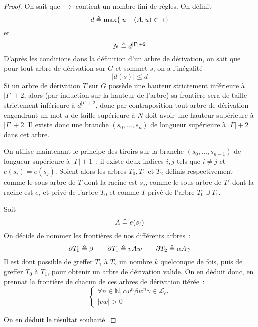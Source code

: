 \begin{proof}
  On sait que $\to$ contient un nombre fini de règles. On définit
  \[d \triangleq \max \{|u| \mid (A,u) \in \to\}\]
  et
  \[N \triangleq d^{|\Gamma|+2}\]
  D'après les conditions dans la définition d'un arbre de dérivation, on sait
  que pour tout arbre de dérivation sur $G$ et sommet $s$, on a l'inégalité
  \[|d(s)| \leq d\]
  Si un arbre de dérivation $T$ sur $G$ possède une hauteur strictement
  inférieure à $|\Gamma| + 2$, alors (par induction sur la hauteur de l'arbre)
  sa frontière sera de taille strictement inférieure à $d^{|\Gamma| + 2}$, donc
  par contraposition tout arbre de dérivation engendrant un mot $u$ de taille
  supérieure à $N$ doit avoir une hauteur supérieure à $|\Gamma| + 2$. Il existe
  donc une branche $(s_0,\ldots,s_n)$ de longueur supérieure à $|\Gamma| + 2$
  dans cet arbre.

  On utilise maintenant le principe des tiroirs sur la branche
  $(s_0,\ldots,s_{n-1})$ de longueur supérieure à $|\Gamma| + 1$~: il existe
  deux indices $i,j$ tels que $i\neq j$ et $e(s_i) = e(s_j)$. Soient alors les
  arbres $T_0,T_1$ et $T_2$ définis respectivement comme le sous-arbre de $T$
  dont la racine est $s_j$, comme le sous-arbre de $T'$ dont la racine est $e_i$
  et privé de l'arbre $T_0$ et comme $T$ privé de l'arbre $T_0\cup T_1$.

  Soit
  \[A \triangleq e(s_i)\]
  On décide de nommer les frontières de nos différents arbres~:
  \[\partial T_0 \triangleq \beta \qquad \partial T_1 \triangleq vAw \qquad
  \partial T_2 \triangleq \alpha A \gamma\]
  Il est dont possible de greffer $T_1$ à $T_2$ un nombre $k$ quelconque de
  fois, puis de greffer $T_0$ à $T_1$, pour obtenir un arbre de dérivation
  valide. On en déduit donc, en prennat la frontière de chacun de ces arbres de
  dérivation itérée~:
  \[\begin{cases}
  \forall n \in \mathbb N, \alpha v^n \beta w^n \gamma \in \mathcal L_G\\
  |vw| > 0
  \end{cases}\]

  On en déduit le résultat souhaité.
\end{proof}

